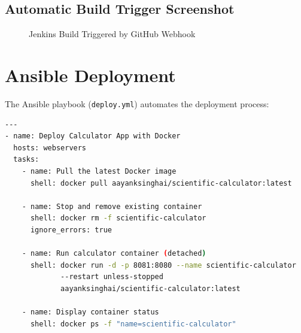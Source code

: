 \documentclass[12pt,a4paper]{article}
\begin{document}
\subsection{Automatic Build Trigger Screenshot}

\begin{figure}[H]
    \centering
    \caption{Jenkins Build Triggered by GitHub Webhook}
    \label{fig:webhook-trigger}
\end{figure}

\section{Ansible Deployment}

The Ansible playbook (\texttt{deploy.yml}) automates the deployment process:

\begin{lstlisting}[language=bash, caption=Ansible Playbook (deploy.yml)]
---
- name: Deploy Calculator App with Docker
  hosts: webservers
  tasks:
    - name: Pull the latest Docker image
      shell: docker pull aayanksinghai/scientific-calculator:latest

    - name: Stop and remove existing container
      shell: docker rm -f scientific-calculator
      ignore_errors: true

    - name: Run calculator container (detached)
      shell: docker run -d -p 8081:8080 --name scientific-calculator
             --restart unless-stopped
             aayanksinghai/scientific-calculator:latest

    - name: Display container status
      shell: docker ps -f "name=scientific-calculator"
\end{lstlisting}
\end{document}
